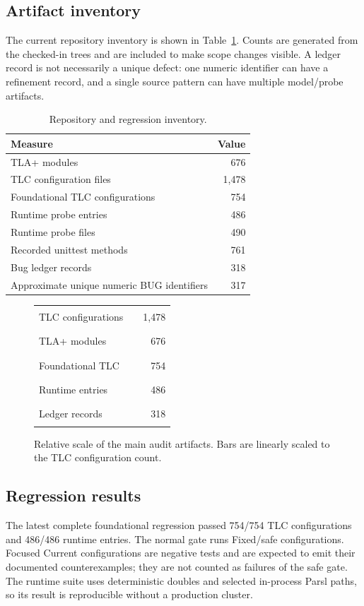 \documentclass[11pt,a4paper]{article}
\begin{document}
\subsection{Artifact inventory}
The current repository inventory is shown in Table~\ref{tab:inventory}. Counts are generated from
the checked-in trees and are included to make scope changes visible. A ledger record is not
necessarily a unique defect: one numeric identifier can have a refinement record, and a single
source pattern can have multiple model/probe artifacts.

\begin{table}[h]
\centering
\caption{Repository and regression inventory.}
\label{tab:inventory}
\begin{tabular}{lr}
\toprule
Measure & Value \\
\midrule
TLA+ modules & 676 \\
TLC configuration files & 1,478 \\
Foundational TLC configurations & 754 \\
Runtime probe entries & 486 \\
Runtime probe files & 490 \\
Recorded unittest methods & 761 \\
Bug ledger records & 318 \\
Approximate unique numeric BUG identifiers & 317 \\
\bottomrule
\end{tabular}
\end{table}

\begin{figure}[h]
\centering
\begin{tabular}{p{} l r}
TLC configurations & \textcolor{cyan}{\rule{0.45\textwidth}{0.8ex}} & 1,478 \\
TLA+ modules & \textcolor{cyan}{\rule{0.21\textwidth}{0.8ex}} & 676 \\
Foundational TLC & \textcolor{cyan}{\rule{0.23\textwidth}{0.8ex}} & 754 \\
Runtime entries & \textcolor{cyan}{\rule{0.15\textwidth}{0.8ex}} & 486 \\
Ledger records & \textcolor{cyan}{\rule{0.10\textwidth}{0.8ex}} & 318
\end{tabular}
\caption{Relative scale of the main audit artifacts. Bars are linearly scaled to the TLC configuration count.}
\label{fig:artifacts}
\end{figure}

\subsection{Regression results}
The latest complete foundational regression passed 754/754 TLC configurations and 486/486 runtime
entries. The normal gate runs Fixed/safe configurations. Focused Current configurations are negative
tests and are expected to emit their documented counterexamples; they are not counted as failures
of the safe gate. The runtime suite uses deterministic doubles and selected in-process Parsl paths,
so its result is reproducible without a production cluster.
\end{document}
